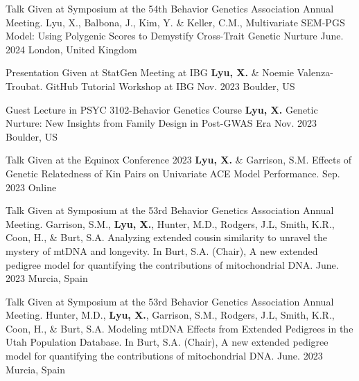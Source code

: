\begin{cventries2}
    \cventryx
    {Talk Given at Symposium at the 54th Behavior Genetics Association Annual Meeting. } %
    {Lyu, X., Balbona, J., Kim, Y. \& Keller, C.M., Multivariate SEM-PGS Model: Using Polygenic Scores to Demystify Cross-Trait Genetic Nurture } 
    {June. 2024} %
    {London, United Kingdom}
    
    \cventryx
	{Presentation Given at StatGen Meeting at IBG} %
    {\textbf{Lyu, X.} \& Noemie Valenza-Troubat. GitHub Tutorial Workshop at IBG} 
    {Nov. 2023} %
    {Boulder, US}
    
    \cventryx
	{Guest Lecture in PSYC 3102-Behavior Genetics Course} %
    {\textbf{Lyu, X.} Genetic Nurture: New Insights from Family Design in Post-GWAS Era} 
    {Nov. 2023} %
    {Boulder, US}
    
    \cventryx
	{Talk Given at the Equinox Conference 2023 } %
    {\textbf{Lyu, X.} \& Garrison, S.M. Effects of Genetic Relatedness of Kin Pairs on Univariate ACE Model Performance.} 
    {Sep. 2023} %
    {Online}
    
    \cventryx
	{Talk Given at Symposium at the 53rd Behavior Genetics Association Annual Meeting. } %
    {Garrison, S.M., \textbf{Lyu, X.}, Hunter, M.D., Rodgers, J.L, Smith, K.R., Coon, H., \& Burt, S.A. Analyzing extended cousin similarity to unravel the mystery of mtDNA and longevity. In Burt, S.A. (Chair), A new extended pedigree model for quantifying the contributions of mitochondrial DNA.} 
    {June. 2023} %
    {Murcia, Spain}
    
    \cventryx
	{Talk Given at Symposium at the 53rd Behavior Genetics Association Annual Meeting. } %
    {Hunter, M.D., \textbf{Lyu, X.}, Garrison, S.M., Rodgers, J.L, Smith, K.R., Coon, H., \& Burt, S.A. Modeling mtDNA Effects from Extended Pedigrees in the Utah Population Database. In Burt, S.A. (Chair), A new extended pedigree model for quantifying the contributions of mitochondrial DNA.} 
    {June. 2023} %
    {Murcia, Spain}
    

\end{cventries2}
